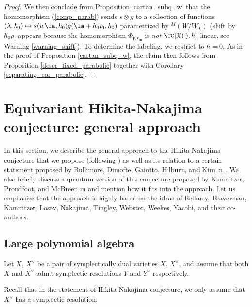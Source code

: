 \documentclass[12pt]{amsart}
\begin{document}
\begin{proof}
We then conclude from Proposition \ref{cartan_subq_w} 
that the homomorphism (\ref{comp_parab}) sends $s \otimes g$ to a collection of functions $(\lambda,\hbar_0) \mapsto s(w\la,\hbar_0) g(\la +\hbar_0\rho_{{\mathfrak{l}}},\hbar_0)$ parametrized by ${}^M(W/W_L)$ (shift by $\hbar_0\rho_{\mathfrak{l}}$ appears because the homomorphism $\Phi_{\mathfrak{p},e_{\mathfrak{m}}}$ is {\emph{not}} $\CC[\mathfrak{X}(\mathfrak{l}),\hbar]$-linear, see Warning \ref{warning_shift}). To determine the labeling, we restrict to $\hbar=0$. As in the proof of Proposition \ref{cartan_subq_w}, the claim then follows from Proposition  \ref{descr_fixed_parabolic} together with Corollary \ref{separating_cor_parabolic}.
\end{proof}



    


\section{Equivariant Hikita-Nakajima conjecture: general approach}\label{equivariant conjecture section}
In this section, we describe the general approach to the Hikita-Nakajima conjecture that we propose (following \cite{ksh}) as well as its relation to a certain statement proposed by Bullimore, Dimofte, Gaiotto, Hilburn, and Kim in \cite{votices_vermas}. We also briefly discuss a quantum version of this conjecture proposed by Kamnitzer, Proudfoot, and McBreen in \cite{kmp} and mention how it fits into the approach. Let us emphasize that the approach is highly based on the ideas of Bellamy, Braverman, Kamnitzer, Losev, Nakajima, Tingley, Webster, Weekes, Yacobi, and their co-authors.



\subsection{Large polynomial algebra} Let $X$, $X^\vee$ be a pair of symplectically dual varieties $X$, $X^\vee$, and assume that both $X$ and $X^\vee$ admit symplectic resolutions $Y$ and $Y^\vee$ respectively. 

\begin{warning}
Recall that in the statement of Hikita-Nakajima conjecture, we only assume that $X^\vee$ has a symplectic resolution.  
\end{warning}
\end{document}
